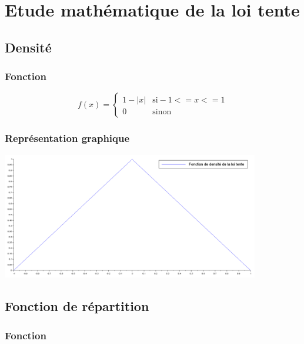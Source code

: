 \documentclass{article}
\begin{document}
\section{Etude mathématique de la loi tente}

\subsection{Densité}

\subsubsection{Fonction}

$$
f(x)=\left\{
	\begin{array}{ll}
		1-|x| & \mbox{si} -1<=x<=1\\
		0 & \mbox{sinon}
	\end{array}
\right.
$$

\subsubsection{Représentation graphique}
\begin{center}
\includegraphics[width=425px]{img/tente.png}
\end{center}
\paragraph{}

\newpage

\subsection{Fonction de répartition}

\subsubsection{Fonction}
\end{document}
